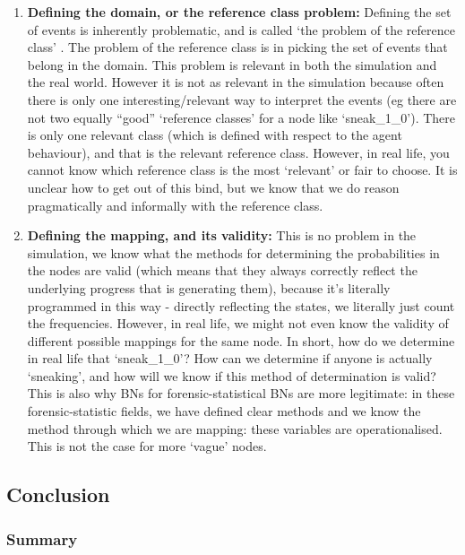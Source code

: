 \documentclass[12pt]{article}
\begin{document}
\begin{enumerate}
\begin{enumerate}
\item \textbf{Defining the domain, or the reference class problem:} Defining the set of events is inherently problematic, and is called `the problem of the reference class' \citep{colyvan2001}. The problem of the reference class is in picking the set of events that belong in the domain. This problem is relevant in both the simulation and the real world.  However it is not as relevant in the simulation because often there is only one interesting/relevant way to interpret the events (eg there are not two equally ``good'' `reference classes' for a node like `sneak\_1\_0'). There is only one relevant class (which is defined with respect to the agent behaviour), and that is the relevant reference class. However, in real life, you cannot know which reference class is the most `relevant' or fair to choose. It is unclear how to get out of this bind, but we know that we do reason pragmatically and informally with the reference class.
\item \textbf{Defining the mapping, and its validity:} This is no problem in the simulation, we know what the methods for determining the probabilities in the nodes are valid (which means that they always correctly reflect the underlying progress that is generating them), because it's literally programmed in this way - directly reflecting the states, we literally just count the frequencies. However, in real life, we might not even know the validity of different possible mappings for the same node. In short, how do we determine in real life that `sneak\_1\_0'? How can we determine if anyone is actually `sneaking', and how will we know if this method of determination is valid? This is also why BNs for forensic-statistical BNs are more legitimate: in these forensic-statistic fields, we have defined clear methods and we know the method through which we are mapping: these variables are operationalised. This is not the case for more `vague' nodes.
\end{enumerate}
\end{enumerate}



\subsection{Conclusion}

\subsubsection{Summary}
 
\end{document}
